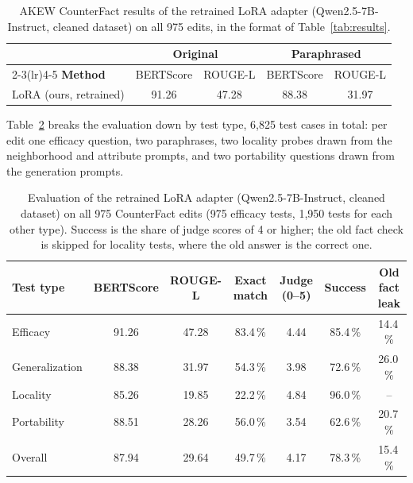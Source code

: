 \documentclass[10pt,a4paper]{article}
\begin{document}
\begin{table}[ht]
\centering
\footnotesize
\begin{tabular}{lcccc}
\toprule
& \multicolumn{2}{c}{\textbf{Original}} & \multicolumn{2}{c}{\textbf{Paraphrased}}\\
\cmidrule(lr){2-3}\cmidrule(lr){4-5}
\textbf{Method} & BERTScore & ROUGE-L & BERTScore & ROUGE-L\\
\midrule
LoRA (ours, retrained) & 91.26 & 47.28 & 88.38 & 31.97\\
\bottomrule
\end{tabular}
\caption{AKEW CounterFact results of the retrained LoRA adapter (Qwen2.5-7B-Instruct,
cleaned dataset) on all 975 edits, in the format of Table~\ref{tab:results}.}
\label{tab:akewnew}
\end{table}

Table~\ref{tab:final} breaks the evaluation down by test type, 6{,}825 test cases in
total: per edit one efficacy question, two paraphrases, two locality probes drawn from
the neighborhood and attribute prompts, and two portability questions drawn from the
generation prompts.

\begin{table}[ht]
\centering
\footnotesize
\begin{tabular}{lcccccc}
\toprule
\textbf{Test type} & BERTScore & ROUGE-L & Exact match & Judge (0--5) & Success & Old fact leak\\
\midrule
Efficacy       & 91.26 & 47.28 & 83.4\,\% & 4.44 & 85.4\,\% & 14.4\,\%\\
Generalization & 88.38 & 31.97 & 54.3\,\% & 3.98 & 72.6\,\% & 26.0\,\%\\
Locality       & 85.26 & 19.85 & 22.2\,\% & 4.84 & 96.0\,\% & --\\
Portability    & 88.51 & 28.26 & 56.0\,\% & 3.54 & 62.6\,\% & 20.7\,\%\\
\midrule
Overall        & 87.94 & 29.64 & 49.7\,\% & 4.17 & 78.3\,\% & 15.4\,\%\\
\bottomrule
\end{tabular}
\caption{Evaluation of the retrained LoRA adapter (Qwen2.5-7B-Instruct, cleaned dataset)
on all 975 CounterFact edits (975 efficacy tests, 1{,}950 tests for each other type).
Success is the share of judge scores of 4 or higher; the old fact check is skipped for
locality tests, where the old answer is the correct one.}
\label{tab:final}
\end{table}
\end{document}
